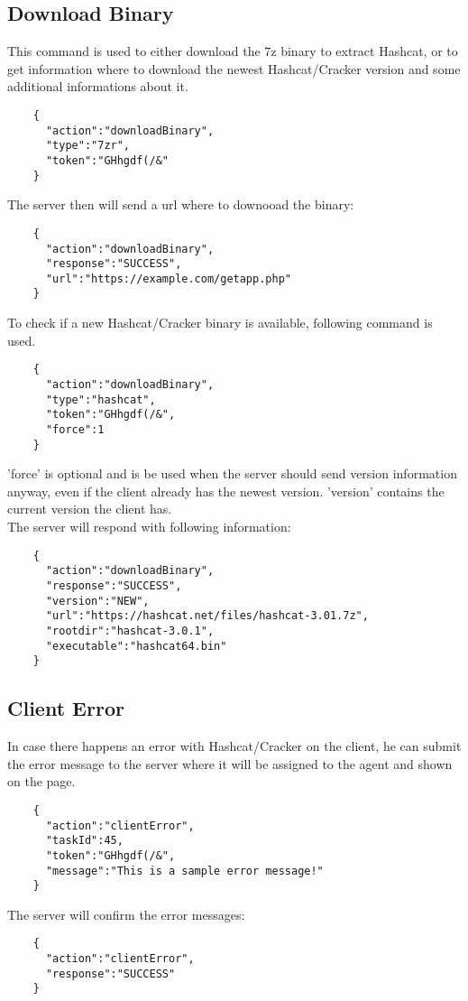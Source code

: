 \documentclass{article}
\begin{document}
	\subsection*{Download Binary}
	This command is used to either download the 7z binary to extract Hashcat, or to get information where to download the newest Hashcat/Cracker version and some additional informations about it.
	\begin{verbatim}
	{
	  "action":"downloadBinary",
	  "type":"7zr",
	  "token":"GHhgdf(/&"
	}
	\end{verbatim}
	The server then will send a url where to downooad the binary:
	\begin{verbatim}
	{
	  "action":"downloadBinary",
	  "response":"SUCCESS",
	  "url":"https://example.com/getapp.php"
	}
	\end{verbatim}
	To check if a new Hashcat/Cracker binary is available, following command is used.
	\begin{verbatim}
	{
	  "action":"downloadBinary",
	  "type":"hashcat",
	  "token":"GHhgdf(/&",
	  "force":1
	}
	\end{verbatim}
	'force' is optional and is be used when the server should send version information anyway, even if the client already has the newest version. 'version' contains the current version the client has.\\
	The server will respond with following information:
	\begin{verbatim}
	{
	  "action":"downloadBinary",
	  "response":"SUCCESS",
	  "version":"NEW",
	  "url":"https://hashcat.net/files/hashcat-3.01.7z",
	  "rootdir":"hashcat-3.0.1",
	  "executable":"hashcat64.bin"
	}
	\end{verbatim}
	
	\subsection*{Client Error}
	In case there happens an error with Hashcat/Cracker on the client, he can submit the error message to the server where it will be assigned to the agent and shown on the page.
	\begin{verbatim}
	{
	  "action":"clientError",
	  "taskId":45,
	  "token":"GHhgdf(/&",
	  "message":"This is a sample error message!"
	}
	\end{verbatim}
	The server will confirm the error messages:
	\begin{verbatim}
	{
	  "action":"clientError",
	  "response":"SUCCESS"
	}
	\end{verbatim}
	
\end{document}
